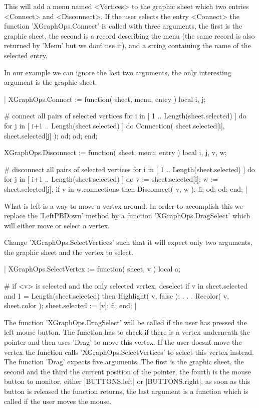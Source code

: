 This will add  a  menu named <Vertices> to  the  graphic sheet  which two
entries <Connect>    and <Disconnect>.  If the  user    selects the entry
<Connect>    the  function  'XGraphOps.Connect' is    called  with  three
arguments, the first   is  the graphic  sheet, the  second  is a   record
describing  the menu (the same  record is also  returned by 'Menu' but we
don\'t use it), and a string containing the name of the selected entry.

In our example we can ignore the last two arguments, the only interesting
argument is the graphic sheet.

|    XGraphOps.Connect := function( sheet, menu, entry )
        local   i,  j;

        # connect all pairs of selected vertices
        for i  in [ 1 .. Length(sheet.selected) ]  do
            for j  in  [ i+1 .. Length(sheet.selected) ]  do
                Connection( sheet.selected[i], sheet.selected[j] );
            od;
        od;
    end;

    XGraphOps.Disconnect := function( sheet, menu, entry )
        local   i,  j,  v,  w;

        # disconnect all pairs of selected vertices
        for i  in [ 1 .. Length(sheet.selected) ]  do
            for j  in [ i+1 .. Length(sheet.selected) ]  do
                v := sheet.selected[i];
                w := sheet.selected[j];
                if v in w.connections  then
                    Disconnect( v, w );
                fi;
            od;
        od;
    end; |

What is  left is a way  to move a vertex around.   In order to accomplish
this      we   replace   the    'LeftPBDown'   method    by  a   function
'XGraphOps.DragSelect' which will either move or select a vertex.

Change  'XGraphOps.SelectVertices'  such that  it  will  expect  only two
arguments, the graphic sheet and the vertex to select.


|    XGraphOps.SelectVertex := function( sheet, v )
        local   a;

        # if <v> is selected and the only selected vertex, deselect
        if v in sheet.selected and 1 = Length(sheet.selected)  then
            Highlight( v, false );
            .
            .
            .
            Recolor( v, sheet.color );
            sheet.selected := [v];
        fi;
    end; |

The  function 'XGraphOps.DragSelect'   will be called   if   the user has
pressed the left mouse  button.  The function has  to check if there is a
vertex  underneath the pointer and then  uses 'Drag' to move this vertex.
If   the   user   doesn\'t   move   the vertex     the   function   calls
'XGraphOps.SelectVertices' to  select this  vertex instead.  The function
'Drag'  expects five  arguments.  The first   is  the graphic  sheet, the
second and the third  the current position of  the pointer, the fourth is
the mouse button to monitor, either |BUTTONS.left| or |BUTTONS.right|, as
soon as this button  is released the  function returns, the last argument
is a function which is called if the user moves the mouse.

